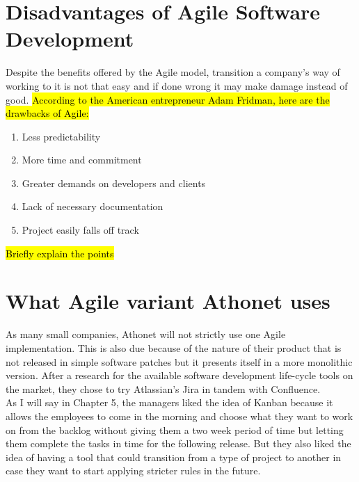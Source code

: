 \section{Disadvantages of Agile Software Development}
	Despite the benefits offered by the Agile model, transition a company's way of working to it is not that easy and if done wrong it may make damage instead of good.
	\hl{According to the American entrepreneur Adam Fridman, here are the drawbacks of Agile:}
	\begin{enumerate}
		\item Less predictability
		\item More time and commitment
		\item Greater demands on developers and clients
		\item Lack of necessary documentation
		\item Project easily falls off track
	\end{enumerate}
	\hl{Briefly explain the points}
	
\section{What Agile variant Athonet uses}
	As many small companies, Athonet will not strictly use one Agile implementation.
	This is also due because of the nature of their product that is not released in simple software patches but it presents itself in a more monolithic version.
	After a research for the available software development life-cycle tools on the market, they chose to try Atlassian's Jira in tandem with Confluence.\\
	As I will say in Chapter 5, the managers liked the idea of Kanban because it allows the employees to come in the morning and choose what they want to work on from the backlog without giving them a two week period of time but letting them complete the tasks in time for the following release.
	But they also liked the idea of having a tool that could transition from a type of project to another in case they want to start applying stricter rules in the future.

